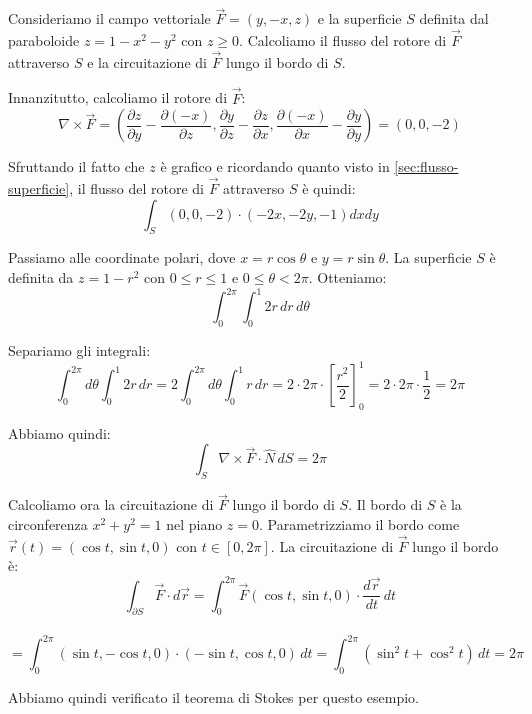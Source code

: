 Consideriamo il campo vettoriale $\vec{F} = (y, -x, z)$ e la superficie $S$ definita dal paraboloide $z = 1 - x^2 - y^2$ con $z \geq 0$. Calcoliamo il flusso del rotore di $\vec{F}$ attraverso $S$ e la circuitazione di $\vec{F}$ lungo il bordo di $S$.

Innanzitutto, calcoliamo il rotore di $\vec{F}$:
\[
\nabla \times \vec{F} = \left( \frac{\partial z}{\partial y} - \frac{\partial (-x)}{\partial z}, \frac{\partial y}{\partial z} - \frac{\partial z}{\partial x}, \frac{\partial (-x)}{\partial x} - \frac{\partial y}{\partial y} \right) = (0, 0, -2)
\]



Sfruttando il fatto che $z$ è grafico e ricordando quanto visto in \ref{sec:flusso-superficie}, il flusso del rotore di $\vec{F}$ attraverso $S$ è quindi:
\[
\int_S (0, 0, -2) \cdot (-2x, -2y, -1) dx dy
\]

Passiamo alle coordinate polari, dove $x = r \cos \theta$ e $y = r \sin \theta$. La superficie $S$ è definita da $z = 1 - r^2$ con $0 \leq r \leq 1$ e $0 \leq \theta < 2\pi$. Otteniamo:
\[
\int_0^{2\pi} \int_0^1 2r \, dr \, d\theta
\]

Separiamo gli integrali:
\[
\int_0^{2\pi} d\theta \int_0^1 2r \, dr = 2 \int_0^{2\pi} d\theta \int_0^1 r \, dr = 2 \cdot 2\pi \cdot \left[ \frac{r^2}{2} \right]_0^1 = 2 \cdot 2\pi \cdot \frac{1}{2} = 2\pi
\]

Abbiamo quindi:
\[
\int_S \nabla \times \vec{F} \cdot \hat{N} \, dS = 2\pi
\]

Calcoliamo ora la circuitazione di $\vec{F}$ lungo il bordo di $S$. Il bordo di $S$ è la circonferenza $x^2 + y^2 = 1$ nel piano $z = 0$. Parametrizziamo il bordo come $\vec{r}(t) = (\cos t, \sin t, 0)$ con $t \in [0, 2\pi]$. La circuitazione di $\vec{F}$ lungo il bordo è:
\[
\int_{\partial S} \vec{F} \cdot d\vec{r} = \int_0^{2\pi} \vec{F}(\cos t, \sin t, 0) \cdot \frac{d\vec{r}}{dt} \, dt
\]
\\
\[= \int_0^{2\pi} (\sin t, -\cos t, 0) \cdot (-\sin t, \cos t, 0) \, dt = \int_0^{2\pi} (\sin^2 t + \cos^2 t) \, dt = 2\pi
\]

Abbiamo quindi verificato il teorema di Stokes per questo esempio.


